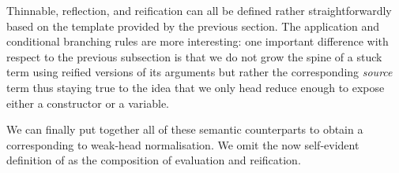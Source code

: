 Thinnable, reflection, and reification can all be defined rather
straightforwardly based on the template provided by the previous
section. The application and conditional branching rules are more
interesting: one important difference with respect to the previous
subsection is that we do not grow the spine of a stuck term using
reified versions of its arguments but rather the corresponding
\emph{source} term thus staying true to the idea that we only head
reduce enough to expose either a constructor or a variable.

We can finally put together all of these semantic counterparts to
obtain a  corresponding to weak-head normalisation.
We omit the now self-evident definition of  as the
composition of evaluation and reification.
